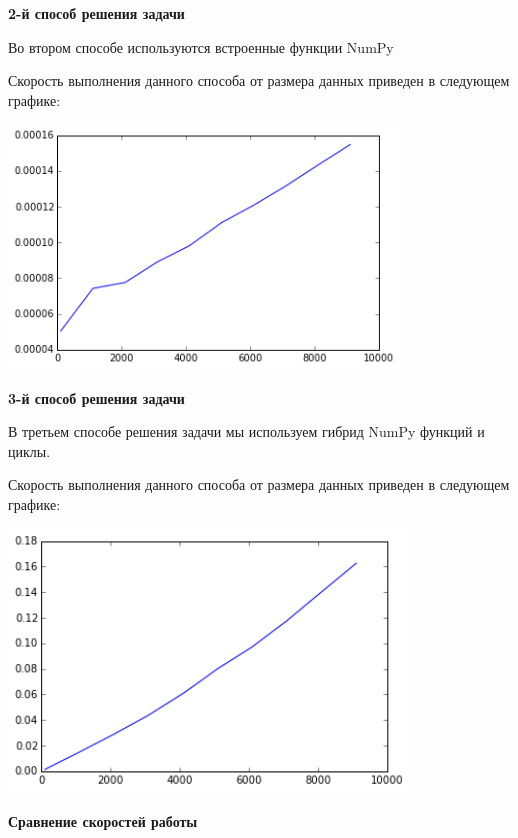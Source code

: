 \documentclass[12pt, a4paper]{article}
\begin{document}
			{\bf 2-й способ решения задачи\\}

				Во втором способе используются встроенные функции NumPy

				Скорость выполнения данного способа от размера данных приведен в следующем графике:
				\begin{center}
					\includegraphics[height=6.5cm]{timeit/num6_ti2.png}
				\end{center}


			{\bf 3-й способ решения задачи\\}

				В третьем способе решения задачи мы используем гибрид NumPy функций и циклы.

				Скорость выполнения данного способа от размера данных приведен в следующем графике:
				\begin{center}
					\includegraphics[height=7cm]{timeit/num6_ti3.png}
				\end{center}


			{\bf Сравнение скоростей работы\\}
\end{document}
